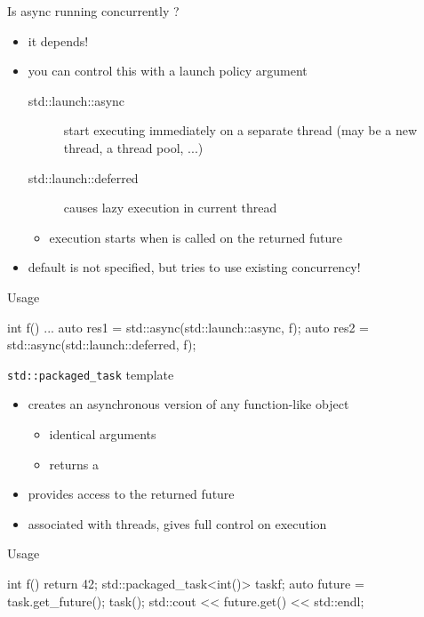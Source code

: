 \begin{frame}[fragile]
  \begin{block}{Is async running concurrently ?}
    \begin{itemize}
    \item it depends!
    \item you can control this with a launch policy argument
      \begin{description}
      \item[std::launch::async] start executing immediately on a separate thread (may be a new thread, a thread pool, ...)
      \item[std::launch::deferred] causes lazy execution in current thread
      \end{description}
      \begin{itemize}
      \item execution starts when  is called on the returned future
      \end{itemize}
    \item default is not specified, but tries to use existing concurrency!
    \end{itemize}
  \end{block}
  \pause
  \begin{exampleblock}{Usage}
    \begin{cppcode*}{}
      int f() {...}
      auto res1 = std::async(std::launch::async, f);
      auto res2 = std::async(std::launch::deferred, f);
    \end{cppcode*}
  \end{exampleblock}
\end{frame}

\begin{frame}[fragile]
  \begin{block}{\texttt{std::packaged\_task} template}
    \begin{itemize}
    \item creates an asynchronous version of any function-like object
      \begin{itemize}
      \item identical arguments
      \item returns a 
      \end{itemize}
    \item provides access to the returned future
    \item associated with threads, gives full control on execution
    \end{itemize}
  \end{block}
  \pause
  \begin{exampleblock}{Usage}
    \begin{cppcode*}{}
      int f() { return 42; }
      std::packaged_task<int()> task{f};
      auto future = task.get_future();
      task();
      std::cout << future.get() << std::endl;
    \end{cppcode*}
  \end{exampleblock}
\end{frame}
